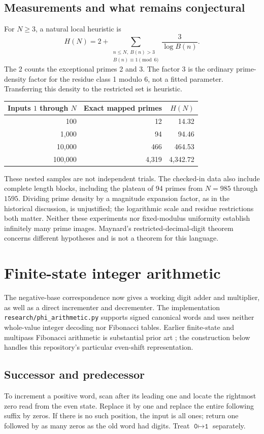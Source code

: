 \documentclass[11pt]{article}
\theoremstyle{definition}\newtheorem{definition}[theorem]{Definition}
\begin{document}
\subsection{Measurements and what remains conjectural}
For $N\ge3$, a natural local heuristic is
\[
H(N)=2+\sum_{\substack{n\le N,\ B(n)>3\\B(n)\equiv1\pmod6}}
\frac{3}{\log B(n)}.
\]
The 2 counts the exceptional primes 2 and 3. The factor 3 is the ordinary
prime-density factor for the residue class 1 modulo 6, not a fitted
parameter. Transferring this density to the restricted set is heuristic.
\begin{center}
\begin{tabular}{rrr}
\toprule
Inputs $1$ through $N$ & Exact mapped primes & $H(N)$\\
\midrule
100&12&14.32\\
1,000&94&94.46\\
10,000&466&464.53\\
100,000&4,319&4,342.72\\
\bottomrule
\end{tabular}
\end{center}
These nested samples are not independent trials. The checked-in data
also include complete length blocks, including the plateau of 94 primes
from $N=985$ through $1595$. Dividing prime density by a magnitude
expansion factor, as in the historical discussion, is unjustified;
the logarithmic scale and residue restrictions both matter. Neither
these experiments nor fixed-modulus uniformity establish infinitely
many prime images. Maynard's restricted-decimal-digit theorem
\cite{maynard} concerns different hypotheses and is not a theorem for
this language.

\section{Finite-state integer arithmetic}\label{sec:arithmetic}
The negative-base correspondence now gives a working digit adder and multiplier,
as well as a direct incrementer and decrementer. The implementation
\texttt{research/phi\_arithmetic.py} supports signed canonical words and
uses neither whole-value integer decoding nor Fibonacci tables. Earlier
finite-state and multipass Fibonacci arithmetic is substantial prior art
\cite{online,zeckendorf}; the construction below handles this repository's
particular even-shift representation.

\subsection{Successor and predecessor}
To increment a positive word, scan after its leading one and locate the
rightmost zero read from the even state. Replace it by one and replace
the entire following suffix by zeros. If there is no such position, the
input is all ones; return one followed by as many zeros as the old word
had digits. Treat $\texttt{0}\mapsto\texttt{1}$ separately.
\end{document}
